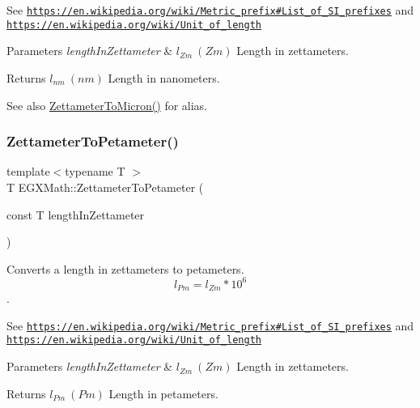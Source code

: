 See \href{https://en.wikipedia.org/wiki/Metric_prefix#List_of_SI_prefixes}{\tt https\+://en.\+wikipedia.\+org/wiki/\+Metric\+\_\+prefix\#\+List\+\_\+of\+\_\+\+S\+I\+\_\+prefixes} and \href{https://en.wikipedia.org/wiki/Unit_of_length}{\tt https\+://en.\+wikipedia.\+org/wiki/\+Unit\+\_\+of\+\_\+length} 
\begin{DoxyParams}{Parameters}
{\em length\+In\+Zettameter} & $ l_{Zm}\ (Zm)$ Length in zettameters. \\
\hline
\end{DoxyParams}
\begin{DoxyReturn}{Returns}
$ l_{nm}\ (nm)$ Length in nanometers. 
\end{DoxyReturn}
\begin{DoxySeeAlso}{See also}
\mbox{\hyperlink{group___e_g_x_math-_conversions-_length_conversions-_s_i-_zettameter-_non-_s_i_gafede369c63111d97f92238e626cdfa87}{Zettameter\+To\+Micron()}} for alias. 
\end{DoxySeeAlso}
\mbox{\label{group___e_g_x_math-_conversions-_length_conversions-_s_i-_zettameter-_s_i_ga85af5c37065cd355ac23b12a4f7b16f5}} 
\subsubsection{\texorpdfstring{Zettameter\+To\+Petameter()}{ZettameterToPetameter()}}
{\footnotesize\ttfamily template$<$typename T $>$ \\
T E\+G\+X\+Math\+::\+Zettameter\+To\+Petameter (\begin{DoxyParamCaption}\item[{const T}]{length\+In\+Zettameter }\end{DoxyParamCaption})}



Converts a length in zettameters to petameters. \[ l_{Pm}=l_{Zm} * 10^{6} \]. 

See \href{https://en.wikipedia.org/wiki/Metric_prefix#List_of_SI_prefixes}{\tt https\+://en.\+wikipedia.\+org/wiki/\+Metric\+\_\+prefix\#\+List\+\_\+of\+\_\+\+S\+I\+\_\+prefixes} and \href{https://en.wikipedia.org/wiki/Unit_of_length}{\tt https\+://en.\+wikipedia.\+org/wiki/\+Unit\+\_\+of\+\_\+length} 
\begin{DoxyParams}{Parameters}
{\em length\+In\+Zettameter} & $ l_{Zm}\ (Zm)$ Length in zettameters. \\
\hline
\end{DoxyParams}
\begin{DoxyReturn}{Returns}
$ l_{Pm}\ (Pm)$ Length in petameters. 
\end{DoxyReturn}
\mbox{\label{group___e_g_x_math-_conversions-_length_conversions-_s_i-_zettameter-_s_i_gae7835234c6727bbfd1e9ad40c54a4740}} 
